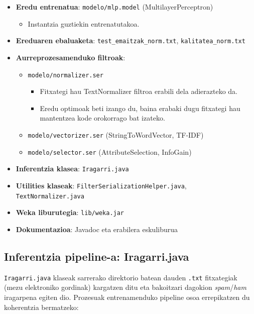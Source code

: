 \documentclass[12pt, a4paper]{article}
\begin{document}
\begin{itemize}
    \item \textbf{Eredu entrenatua}: \texttt{modelo/mlp.model} (MultilayerPerceptron)
    \begin{itemize}
            \item Instantzia guztiekin entrenatutakoa.
        \end{itemize}
    \item \textbf{Ereduaren ebaluaketa}: \texttt{test\_emaitzak\_norm.txt}, \texttt{kalitatea\_norm.txt}
    \item \textbf{Aurreprozesamenduko filtroak}:
    \begin{itemize}
        \item \texttt{modelo/normalizer.ser}
        \begin{itemize}
            \item Fitxategi hau TextNormalizer filtroa erabili dela adierazteko da.
            \item Eredu optimoak beti izango du, baina erabaki dugu fitxategi hau mantentzea kode orokorrago bat izateko.
        \end{itemize}
        \item \texttt{modelo/vectorizer.ser} (StringToWordVector, TF-IDF)
        \item \texttt{modelo/selector.ser} (AttributeSelection, InfoGain)
    \end{itemize}
    \item \textbf{Inferentzia klasea}: \texttt{Iragarri.java}
    \item \textbf{Utilities klaseak}: \texttt{FilterSerializationHelper.java}, \texttt{TextNormalizer.java}
    \item \textbf{Weka liburutegia}: \texttt{lib/weka.jar}
    \item \textbf{Dokumentazioa}: Javadoc eta erabilera eskuliburua
\end{itemize}

\subsection{Inferentzia pipeline-a: Iragarri.java}

\texttt{Iragarri.java} klaseak sarrerako direktorio batean dauden \texttt{.txt} fitxategiak (mezu elektroniko gordinak) kargatzen ditu eta bakoitzari dagokion \textit{spam}/\textit{ham} iragarpena egiten dio. Prozesuak entrenamenduko pipeline osoa errepikatzen du koherentzia bermatzeko:
\end{document}
